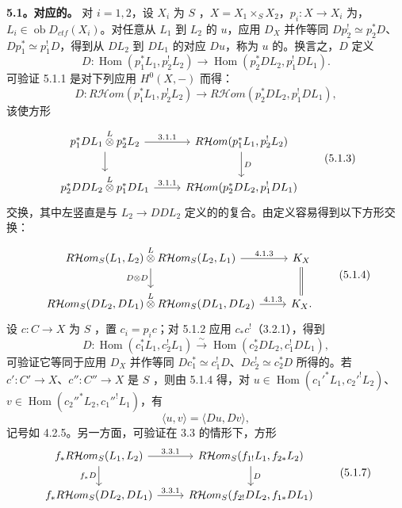 \textbf{5.1。对应的。} 对 $i=1,2$，设 $X_i$ 为 $S$ ，$X=X_1\times_SX_2$，$p_i:X\to X_i$ 为，$L_i\in\operatorname{ob}D_{ctf}(X_i)$。对任意从 $L_1$ 到 $L_2$ 的 $u$，应用 $D_X$ 并作等同 $Dp_2^!\simeq p_2^*D$、$Dp_1^*\simeq p_1^!D$，得到从 $DL_2$ 到 $DL_1$ 的对应 $Du$，称为 $u$ 的。换言之，$D$ 定义
\[D:\operatorname{Hom}(p_1^*L_1,p_2^!L_2)\longrightarrow\operatorname{Hom}(p_2^*DL_2,p_1^!DL_1).\tag{5.1.1}\]
可验证 5.1.1 是对下列应用 $H^0(X,-)$ 而得：
\[D:R\mathcal Hom(p_1^*L_1,p_2^!L_2)\longrightarrow R\mathcal Hom(p_2^*DL_2,p_1^!DL_1),\tag{5.1.2}\]
该使方形
\[\begin{tikzcd}
p_1^*DL_1\mathbin{\overset L\otimes}p_2^*L_2\arrow[r,"3.1.1"]\arrow[d]&R\mathcal Hom(p_1^*L_1,p_2^!L_2)\arrow[d,"D"]\\p_2^*DDL_2\mathbin{\overset L\otimes}p_1^*DL_1\arrow[r,"3.1.1"]&R\mathcal Hom(p_2^*DL_2,p_1^!DL_1)
\end{tikzcd}\tag{5.1.3}\]
交换，其中左竖直是与 $L_2\to DDL_2$ 定义的的复合。由定义容易得到以下方形交换：
\[\begin{tikzcd}
R\mathcal Hom_S(L_1,L_2)\mathbin{\overset L\otimes}R\mathcal Hom_S(L_2,L_1)\arrow[r,"4.1.3"]\arrow[d,"D\otimes D"']&K_X\arrow[d,equal]\\R\mathcal Hom_S(DL_2,DL_1)\mathbin{\overset L\otimes}R\mathcal Hom_S(DL_1,DL_2)\arrow[r,"4.1.3"]&K_X.
\end{tikzcd}\tag{5.1.4}\]
设 $c:C\to X$ 为 $S$ ，置 $c_i=p_ic$；对 5.1.2 应用 $c_*c^!$（3.2.1），得到
\[D:\operatorname{Hom}(c_1^*L_1,c_2^!L_1)\xrightarrow\sim\operatorname{Hom}(c_2^*DL_2,c_1^!DL_1),\tag{5.1.5}\]
可验证它等同于应用 $D_X$ 并作等同
$Dc_1^*\simeq c_1^!D$、$Dc_2^!\simeq c_2^*D$ 所得的。若 $c':C'\to X$、$c'':C''\to X$ 是 $S$ ，则由 5.1.4 得，对 $u\in\operatorname{Hom}(c_1'^*L_1,c_2'^!L_2)$、$v\in\operatorname{Hom}(c_2''^*L_2,c_1''^!L_1)$，有
\[\langle u,v\rangle=\langle Du,Dv\rangle,\tag{5.1.6}\]
记号如 4.2.5。另一方面，可验证在 3.3 的情形下，方形
\[\begin{tikzcd}
f_*R\mathcal Hom_S(L_1,L_2)\arrow[r,"3.3.1"]\arrow[d,"f_*D"']&R\mathcal Hom_S(f_{1!}L_1,f_{2*}L_2)\arrow[d,"D"]\\ f_*R\mathcal Hom_S(DL_2,DL_1)\arrow[r,"3.3.1"]&R\mathcal Hom_S(f_{2!}DL_2,f_{1*}DL_1)
\end{tikzcd}\tag{5.1.7}\]
